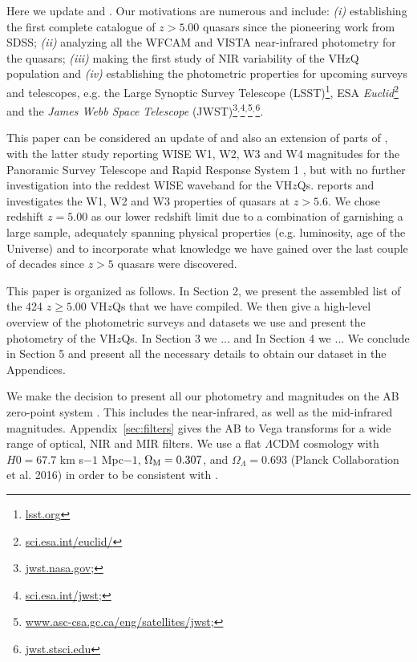 \documentclass[usenatbib]{mnras}
\begin{document}
Here we update \citet{Jiang2010} and \citet{Blain2013} \citep[along
with Table 8 of][]{Banados2016}. Our motivations are numerous and
include: {\it (i)} establishing the first complete catalogue of
$z>5.00$ quasars since the pioneering work from SDSS; {\it (ii)}
analyzing all the WFCAM and VISTA near-infrared photometry for the
quasars; {\it (iii)} making the first study of NIR variability of the
VHzQ population and {\it (iv)} establishing the photometric properties
for upcoming surveys and telescopes, e.g. the Large Synoptic Survey
Telescope (LSST)\footnote{\href{https://www.lsst.org}{{lsst.org}}},
ESA {\it
Euclid}\footnote{\href{https://sci.esa.int/euclid/}{sci.esa.int/euclid/}}
and the {\it James Webb Space Telescope}
(JWST)\footnote{\href{https://www.jwst.nasa.gov/}{jwst.nasa.gov};}$^,$\footnote{\href{https://sci.esa.int/jwst/}{sci.esa.int/jwst};}$^,$\footnote{\href{https://www.asc-csa.gc.ca/eng/satellites/jwst/}{www.asc-csa.gc.ca/eng/satellites/jwst};}$^,$\footnote{\href{https://jwst.stsci.edu/}{jwst.stsci.edu}}.

This paper can be considered an update of \citet{Blain2013} and also
an extension of parts of \citet{Banados2016}, with the latter study
reporting WISE W1, W2, W3 and W4 magnitudes for the Panoramic Survey
Telescope and Rapid Response System 1 \citep[Pan-STARRS1,
PS1;][]{Kaiser2002, Kaiser2010}, but with no further investigation
into the reddest WISE waveband for the VH$z$Qs.  \citet{Banados2016}
reports and investigates the W1, W2 and W3 properties of quasars at $z
> 5.6$. We chose redshift $z=5.00$ as our lower redshift limit due to
a combination of garnishing a large sample, adequately spanning
physical properties (e.g. luminosity, age of the Universe) and to
incorporate what knowledge we have gained over the last couple of
decades since $z>5$ quasars were discovered.

This paper is organized as follows.  In Section 2, we present the
assembled list of the 424 $z\geq5.00$ VH$z$Qs that we have
compiled. We then give a high-level overview of the photometric
surveys and datasets we use and present the photometry of the VH$z$Qs.
In Section 3 we ... and In Section 4 we ... We conclude in Section 5 
and present all the necessary details to obtain our dataset in the 
Appendices. 

We make the decision to present all our photometry and magnitudes on
the AB zero-point system \citep{Oke_Gunn1983, Fukugita1996}.  This
includes the near-infrared, as well as the mid-infrared magnitudes.
Appendix~\ref{sec:filters} gives the AB to Vega transforms for a wide
range of optical, NIR and MIR filters. We use a flat $\Lambda$CDM
cosmology with $H0 = 67.7$ km s$-1$ Mpc$−1$, $\Omega_{\rm M} = 0.307$,
and $\Omega_{\Lambda} = 0.693$ (Planck Collaboration et al. 2016) in
order to be consistent with \citet{Banados2016}.
\end{document}
